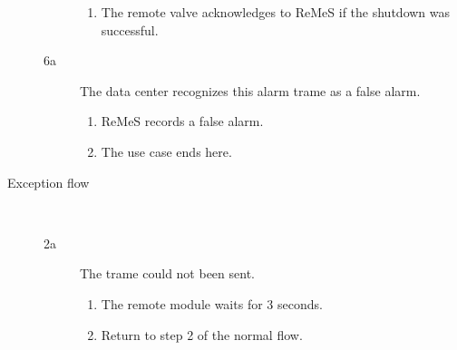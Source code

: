 \begin{description}
\begin{description}
\begin{enumerate}
				\item The remote valve acknowledges to ReMeS if the shutdown was successful.
			\end{enumerate}
		\item[6a] The data center recognizes this alarm trame as a false alarm.
		\begin{enumerate}
			\item ReMeS records a false alarm.
			\item The use case ends here. 
		\end{enumerate}
	\end{description}
	\item[Exception flow] \ 
	\begin{description}
		\item[2a] The trame could not been sent. 
		\begin{enumerate}
			\item The remote module waits for 3 seconds.
			\item Return to step 2 of the normal flow.
		\end{enumerate}
	\end{description}
\end{description}